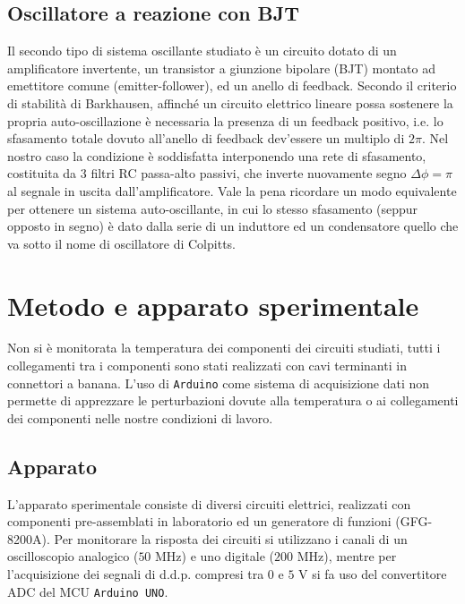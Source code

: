\documentclass{article}[a4paper, oneside, 11pt]
\begin{document}
\subsection{Oscillatore a reazione con BJT}
Il secondo tipo di sistema oscillante studiato è un circuito dotato di
un amplificatore invertente, un transistor a giunzione bipolare (BJT) montato
ad emettitore comune (emitter-follower), ed un anello di feedback.
Secondo il criterio di stabilità di Barkhausen, affinché un circuito
elettrico lineare possa sostenere la propria auto-oscillazione è necessaria
la presenza di un feedback positivo, i.e. lo sfasamento totale dovuto
all'anello di feedback dev'essere un multiplo di $2\pi$. Nel nostro caso la
condizione è soddisfatta interponendo una rete di sfasamento, costituita da
3 filtri RC passa-alto passivi, che inverte nuovamente segno
$\Delta \phi = \pi$
al segnale in uscita dall'amplificatore. Vale la pena ricordare un
modo equivalente per ottenere un sistema auto-oscillante, in cui lo stesso
sfasamento (seppur opposto in segno) è dato dalla serie di un induttore ed
un condensatore quello che va sotto il nome di oscillatore di Colpitts.
\section{Metodo e apparato sperimentale}
Non si è monitorata la temperatura dei componenti dei circuiti studiati,
tutti i collegamenti tra i componenti sono stati realizzati con cavi
terminanti in connettori a banana. L'uso di \verb+Arduino+\cite{arduino}
come sistema di acquisizione dati non permette di apprezzare le perturbazioni
dovute alla temperatura o ai collegamenti dei componenti nelle nostre
condizioni di lavoro.
\subsection{Apparato}
L'apparato sperimentale consiste di diversi circuiti elettrici,
realizzati con componenti pre-assemblati in laboratorio ed un generatore di
funzioni (GFG-8200A).
Per monitorare la risposta dei circuiti si utilizzano i canali di un oscilloscopio
analogico ($50$ MHz) e uno digitale ($200$ MHz), mentre per l'acquisizione dei
segnali di d.d.p. compresi tra $0$ e $5$ V si fa uso del convertitore ADC
del MCU \verb+Arduino UNO+.
\end{document}
